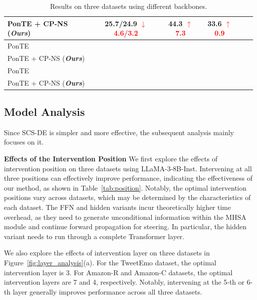 \documentclass[11pt]{article}
\newcommand{\up}[1]{\textcolor{red}{{$\uparrow$#1}}}
\newcommand{\down}[1]{\textcolor{red}{{$\downarrow$#1}}}
\begin{document}
\begin{table}[t]
{\begin{tabular}{lccccc}
PonTE + CP-NS (\textbf{\textit{Ours}}) & \cellcolor{tabcolor3} 25.7/24.9 \down{4.6/3.2} & \cellcolor{tabcolor3} 44.3 \up{7.3} & \cellcolor{tabcolor3}33.6 \up{0.9}   \\
\midrule
PonTE &    \\
PonTE + CP-NS (\textbf{\textit{Ours}}) &   \\
\midrule
PonTE &    \\
PonTE + CP-NS (\textbf{\textit{Ours}})  &   \\
\bottomrule
\end{tabular}
}
\caption{Results on three datasets using different backbones.}
\label{tab:backbone}
\end{table}
\fi

\subsection{Model Analysis}
Since SCS-DE is simpler and more effective, the subsequent analysis mainly focuses on it.


\textbf{Effects of the Intervention Position}
We first explore the effects of intervention position on three datasets using LLaMA-3-8B-Inst.
Intervening at all three positions can effectively improve performance, indicating the effectiveness of our method, as shown in Table~\ref{tab:position}.
Notably, the optimal intervention positions vary across datasets, which may be determined by the characteristics of each dataset.
The FFN and hidden variants incur theoretically higher time overhead, as they need to generate unconditional information within the MHSA module and continue forward propagation for steering.
In particular, the hidden variant needs to run through a complete Transformer layer.

We also explore the effects of intervention layer on three datasets in Figure~\ref{fig:layer_analysis}(a).
For the TweetEmo dataset, the optimal intervention layer is 3. For Amazon-R and Amazon-C datasets, the optimal intervention layers are 7 and 4, respectively.
Notably, intervening at the 5-th or 6-th layer generally improves performance across all three datasets.
\end{document}

